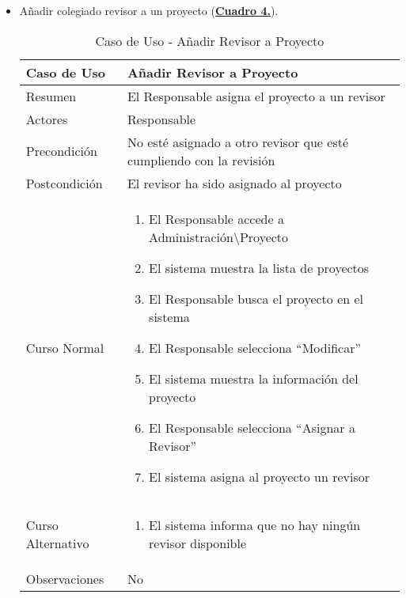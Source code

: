 \begin{itemize}
    \pagebreak
		\item \addtocounter{tabla}{1} Añadir colegiado revisor a un proyecto (\textbf{\hyperref[tab:curAsignarRevisorProyecto]{Cuadro 4.}}). 
		\begin{table}[!htbp]
		  \centering  \addtocounter{casouso}{1}
		  \begin{tabular}{|l | p{100mm}|}
		    \textbf{Caso de Uso}  & \textbf{Añadir Revisor a Proyecto} \\ \hline
		    Resumen 		 & El Responsable asigna el proyecto a un revisor \\ \hline
		    Actores  		 & Responsable \\ \hline
		    Precondición  	 & No esté asignado a otro revisor que esté cumpliendo con la revisión  \\ \hline
		    Postcondición  	 & El revisor ha sido asignado al proyecto \\ \hline
		    Curso Normal   	 & \begin{enumerate}
		      \item El Responsable accede a Administración\textbackslash Proyecto
			  \item El sistema muestra la lista de proyectos
			  \item El Responsable busca el proyecto en el sistema
			  \item El Responsable selecciona ``Modificar''
			  \item El sistema muestra la información del proyecto
			  \item El Responsable selecciona ``Asignar a Revisor''
			  \item El sistema asigna al proyecto un revisor
		    \end{enumerate}  \\ \hline
		    Curso Alternativo  & \begin{enumerate}
			  \item El sistema informa que no hay ningún revisor disponible
		    \end{enumerate}  \\ \hline
		    Observaciones 	 & No  \\ \hline
		  \end{tabular}
		  \caption{Caso de Uso  - Añadir Revisor a Proyecto}
		  \label{tab:curAsignarRevisorProyecto}
		\end{table}
		\FloatBarrier


\end{itemize}
